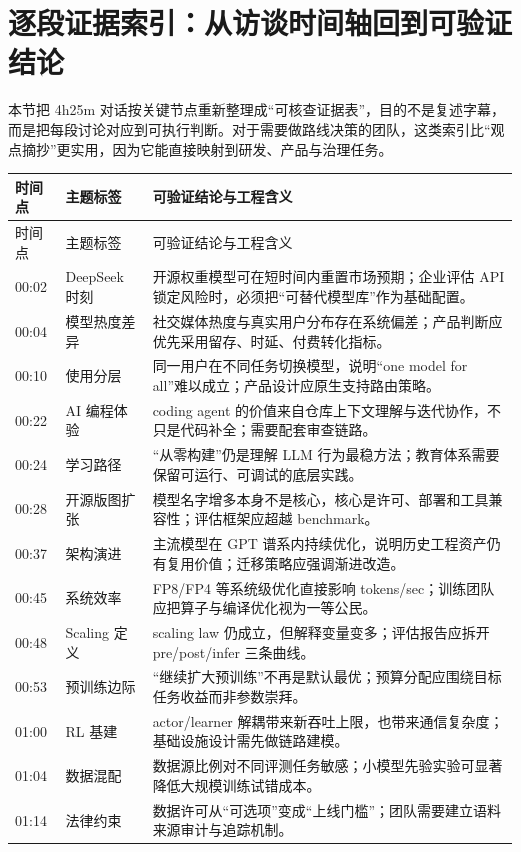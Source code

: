 \section{逐段证据索引：从访谈时间轴回到可验证结论}

本节把 4h25m 对话按关键节点重新整理成“可核查证据表”，目的不是复述字幕，而是把每段讨论对应到可执行判断。对于需要做路线决策的团队，这类索引比“观点摘抄”更实用，因为它能直接映射到研发、产品与治理任务。

\begin{longtable}{p{}p{}p{}}
\toprule
时间点 & 主题标签 & 可验证结论与工程含义 \\
\midrule
\endfirsthead
\toprule
时间点 & 主题标签 & 可验证结论与工程含义 \\
\midrule
\endhead
00:02 & DeepSeek 时刻 & 开源权重模型可在短时间内重置市场预期；企业评估 API 锁定风险时，必须把“可替代模型库”作为基础配置。 \\
00:04 & 模型热度差异 & 社交媒体热度与真实用户分布存在系统偏差；产品判断应优先采用留存、时延、付费转化指标。 \\
00:10 & 使用分层 & 同一用户在不同任务切换模型，说明“one model for all”难以成立；产品设计应原生支持路由策略。 \\
00:22 & AI 编程体验 & coding agent 的价值来自仓库上下文理解与迭代协作，不只是代码补全；需要配套审查链路。 \\
00:24 & 学习路径 & “从零构建”仍是理解 LLM 行为最稳方法；教育体系需要保留可运行、可调试的底层实践。 \\
00:28 & 开源版图扩张 & 模型名字增多本身不是核心，核心是许可、部署和工具兼容性；评估框架应超越 benchmark。 \\
00:37 & 架构演进 & 主流模型在 GPT 谱系内持续优化，说明历史工程资产仍有复用价值；迁移策略应强调渐进改造。 \\
00:45 & 系统效率 & FP8/FP4 等系统级优化直接影响 tokens/sec；训练团队应把算子与编译优化视为一等公民。 \\
00:48 & Scaling 定义 & scaling law 仍成立，但解释变量变多；评估报告应拆开 pre/post/infer 三条曲线。 \\
00:53 & 预训练边际 & “继续扩大预训练”不再是默认最优；预算分配应围绕目标任务收益而非参数崇拜。 \\
01:00 & RL 基建 & actor/learner 解耦带来新吞吐上限，也带来通信复杂度；基础设施设计需先做链路建模。 \\
01:04 & 数据混配 & 数据源比例对不同评测任务敏感；小模型先验实验可显著降低大规模训练试错成本。 \\
01:14 & 法律约束 & 数据许可从“可选项”变成“上线门槛”；团队需要建立语料来源审计与追踪机制。 \\

\end{longtable}
